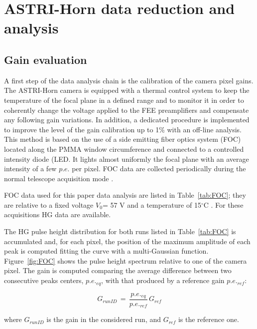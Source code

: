 \section{ASTRI-Horn data reduction and analysis} 
\label{sect:astridata}

\subsection{Gain evaluation}
\label{subs:gain}

A first step of the data analysis chain is the calibration of the camera pixel gains. 
The ASTRI-Horn camera is equipped with a thermal control system to keep the temperature of the focal plane in a defined range and to monitor it in order to coherently change the voltage applied to the FEE preamplifiers  and compensate any following  gain variations. In addition, a dedicated procedure is implemented to improve the level of the gain calibration up to 1\% with an off-line analysis. This method is based on the use of a side emitting fiber optics system (FOC) located along the PMMA window circumference and connected to a controlled intensity diode (LED. It lights almost uniformly the focal plane with an average intensity of a few $p.e.$ per pixel. FOC data are collected periodically during the normal telescope acquisition mode .

FOC data used for this paper data analysis are listed in Table~\ref{tab:FOC}; they are relative to a fixed voltage $V_{0}$= 57 V  and a temperature of 15$^\circ$C . For these acquisitions HG data are available.

The HG pulse height distribution for both runs listed in Table~\ref{tab:FOC} is accumulated and, for each pixel, the position of the maximum amplitude of each peak is computed fitting the curve with a multi-Gaussian function. Figure~\ref{fig:FOC} shows the pulse height spectrum relative to one of the camera pixel. The gain is computed comparing the average difference between two consecutive peaks centers, $p.e._{eq}$, with that produced by a reference gain $p.e._{ref}$:

\begin{equation}
G_{run ID}\,=\,\frac{p.e._{eq}}{p.e._{ref}}\,G_{ref}
\end{equation}

\noindent
where $G_{run ID}$ is the gain in the considered run, and $G_{ref}$ is the reference one.


